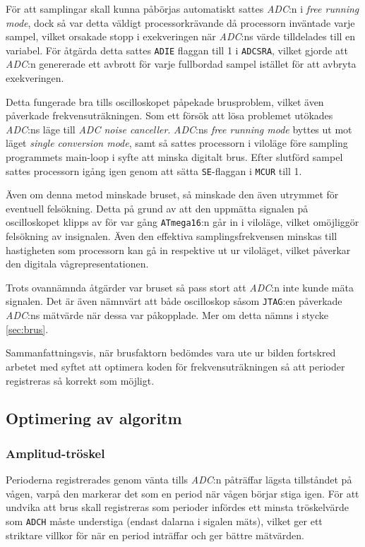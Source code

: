 \documentclass[a4paper]{article}
\begin{document}
För att samplingar skall kunna påbörjas automatiskt sattes \textit{ADC}:n i \textit{free running mode}, dock så var detta väldigt processorkrävande då processorn inväntade varje sampel, vilket orsakade stopp i exekveringen när \textit{ADC}:ns värde tilldelades till en variabel. För åtgärda detta sattes \texttt{ADIE} flaggan till 1 i \texttt{ADCSRA}, vilket gjorde att \textit{ADC}:n genererade ett avbrott för varje fullbordad sampel istället för att avbryta exekveringen.

Detta fungerade bra tills oscilloskopet påpekade brusproblem, vilket även påverkade frekvensuträkningen. Som ett försök att lösa problemet utökades \textit{ADC}:ns läge till \textit{ADC noise canceller}.\cite[p.~210]{atmega16} \textit{ADC}:ns \textit{free running mode} byttes ut mot läget \textit{single conversion mode}, samt så sattes processorn i viloläge före sampling programmets main-loop i syfte att minska digitalt brus.\cite[p.~219]{atmega16} Efter slutförd sampel sattes processorn igång igen genom att sätta \texttt{SE}-flaggan i \texttt{MCUR} till 1.

Även om denna metod minskade bruset, så minskade den även utrymmet för eventuell felsökning. Detta på grund av att den uppmätta signalen på oscilloskopet klipps av för var gång \texttt{ATmega16}:n går in i viloläge, vilket omöjliggör felsökning av insignalen. Även den effektiva samplingsfrekvensen minskas till hastigheten som processorn kan gå in respektive ut ur viloläget, vilket påverkar den digitala vågrepresentationen.

Trots ovannämnda åtgärder var bruset så pass stort att \textit{ADC}:n inte kunde mäta signalen. Det är även nämnvärt att både oscilloskop såsom \texttt{JTAG}:en påverkade \textit{ADC}:ns mätvärde när dessa var påkopplade. Mer om detta nämns i stycke \ref{sec:brus}.

Sammanfattningsvis, när brusfaktorn bedömdes vara ute ur bilden fortskred arbetet med syftet att optimera koden för frekvensuträkningen så att perioder registreras så korrekt som möjligt.

\subsection{Optimering av algoritm}

\subsubsection{Amplitud-tröskel}
Perioderna registrerades genom vänta tills \textit{ADC}:n påträffar lägsta tillståndet på vågen, varpå den markerar det som en period när vågen börjar stiga igen. För att undvika att brus skall registreras som perioder infördes ett minsta tröskelvärde som \texttt{ADCH} måste understiga (endast dalarna i sigalen mäts), vilket ger ett striktare villkor för när en period inträffar och ger bättre mätvärden.
\end{document}
